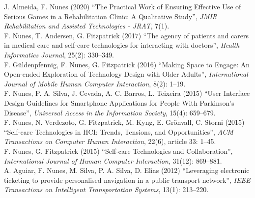 \documentclass[11pt, a4paper]{article} %
\newcommand{\years}[1]{\marginnote{\scriptsize #1}} %
\begin{document}
\years{2020}J. Almeida, F. Nunes (2020) ``The Practical Work of Ensuring Effective Use of Serious Games in a Rehabilitation Clinic: A Qualitative Study'', \emph{JMIR Rehabilitation and Assisted Technologies - JRAT}, 7(1).\\
\years{2017}F. Nunes, T. Andersen, G. Fitzpatrick (2017) ``The agency of patients and carers in medical care and self-care technologies for interacting with doctors'', \emph{Health Informatics Journal}, 25(2): 330--349.\\
\years{2016}F. Güldenpfennig, F. Nunes, G. Fitzpatrick (2016) ``Making Space to Engage: An Open-ended Exploration of Technology Design with Older Adults'', \emph{International Journal of Mobile Human Computer Interaction}, 8(2): 1--19.\\
\years{2016}F. Nunes, P. A. Silva, J. Cevada, A. C. Barros, L. Teixeira (2015) ``User Interface Design Guidelines for Smartphone Applications for People With Parkinson's Disease'', \emph{Universal Access in the Information Society}, 15(4): 659--679.\\
\years{2015}F. Nunes, N. Verdezoto, G. Fitzpatrick, M. Kyng, E. Grönvall, C. Storni (2015) ``Self-care Technologies in HCI: Trends, Tensions, and Opportunities'', \emph{ACM Transactions on Computer Human Interaction}, 22(6), article 33: 1--45.\\
\years{2015}F. Nunes, G. Fitzpatrick (2015) ``Self-care Technologies and Collaboration'', \emph{International Journal of Human Computer Interaction}, 31(12): 869--881.\\
\years{2012}A. Aguiar, F. Nunes, M. Silva, P. A. Silva, D. Elias (2012) ``Leveraging electronic ticketing to provide personalised navigation in a public transport network'', \emph{IEEE Transactions on Intelligent Transportation Systems}, 13(1): 213--220.
\end{document}
